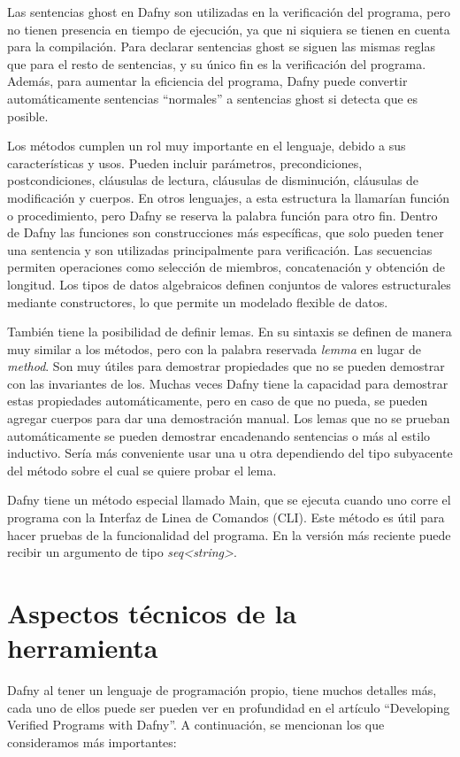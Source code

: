 \documentclass[runningheads]{llncs}
\begin{document}
Las sentencias ghost en Dafny son utilizadas en la verificación del programa, pero no tienen presencia en tiempo de ejecución, ya que ni siquiera se tienen en cuenta para la compilación.
Para declarar sentencias ghost se siguen las mismas reglas que para el resto de sentencias, y su único fin es la verificación del programa.
Además, para aumentar la eficiencia del programa, Dafny puede convertir automáticamente sentencias ``normales'' a sentencias ghost si detecta que es posible.

Los métodos cumplen un rol muy importante en el lenguaje, debido a sus características y usos.
Pueden incluir parámetros, precondiciones, postcondiciones, cláusulas de lectura, cláusulas de disminución, cláusulas de modificación y cuerpos.
En otros lenguajes, a esta estructura la llamarían función o procedimiento, pero Dafny se reserva la palabra función para otro fin.
Dentro de Dafny las funciones son construcciones más específicas, que solo pueden tener una sentencia y son utilizadas principalmente para verificación.
Las secuencias permiten operaciones como selección de miembros, concatenación y obtención de longitud.
Los tipos de datos algebraicos definen conjuntos de valores estructurales mediante constructores, lo que permite un modelado flexible de datos.

También tiene la posibilidad de definir lemas. En su sintaxis se definen de manera muy similar a los métodos, pero con la palabra reservada \textit{lemma} en lugar de \textit{method}.
Son muy útiles para demostrar propiedades que no se pueden demostrar con las invariantes de los.
Muchas veces Dafny tiene la capacidad para demostrar estas propiedades automáticamente, pero en caso de que no pueda, se pueden agregar cuerpos para dar una demostración manual.
Los lemas que no se prueban automáticamente se pueden demostrar encadenando sentencias o más al estilo inductivo. Sería más conveniente usar una u otra dependiendo del tipo subyacente del método sobre el cual se quiere probar el lema.

Dafny tiene un método especial llamado Main, que se ejecuta cuando uno corre el programa con la Interfaz de Linea de Comandos (CLI). Este método es útil para hacer pruebas de la funcionalidad del programa.
En la versión más reciente puede recibir un argumento de tipo \textit{seq<string>}.

\section{Aspectos técnicos de la herramienta}
Dafny al tener un lenguaje de programación propio, tiene muchos detalles más, cada uno de ellos puede ser pueden ver en profundidad en el artículo 
``Developing Verified Programs with Dafny''\cite{10.1007/978-3-642-27705-4_7}.
A continuación, se mencionan los que consideramos más importantes:
\end{document}
